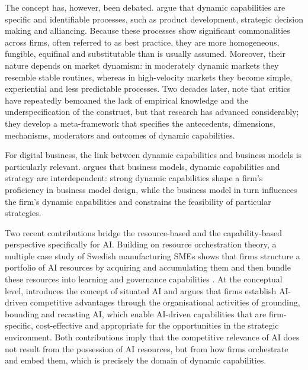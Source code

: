 The concept has, however, been debated. \textcite[1105]{eisenhardt2000} argue that dynamic capabilities are specific and identifiable processes, such as product development, strategic decision making and alliancing. Because these processes show significant commonalities across firms, often referred to as best practice, they are more homogeneous, fungible, equifinal and substitutable than is usually assumed. Moreover, their nature depends on market dynamism: in moderately dynamic markets they resemble stable routines, whereas in high-velocity markets they become simple, experiential and less predictable processes. Two decades later, \textcite[390]{schilke2018} note that critics have repeatedly bemoaned the lack of empirical knowledge and the underspecification of the construct, but that research has advanced considerably; they develop a meta-framework that specifies the antecedents, dimensions, mechanisms, moderators and outcomes of dynamic capabilities.

For digital business, the link between dynamic capabilities and business models is particularly relevant. \textcite[40]{teece2018} argues that business models, dynamic capabilities and strategy are interdependent: strong dynamic capabilities shape a firm's proficiency in business model design, while the business model in turn influences the firm's dynamic capabilities and constrains the feasibility of particular strategies.

Two recent contributions bridge the resource-based and the capability-based perspective specifically for AI. Building on resource orchestration theory, a multiple case study of Swedish manufacturing SMEs shows that firms structure a portfolio of AI resources by acquiring and accumulating them and then bundle these resources into learning and governance capabilities \parencite[1]{slrR057}. At the conceptual level, \textcite[618]{slrR087} introduces the concept of situated AI and argues that firms establish AI-driven competitive advantages through the organisational activities of grounding, bounding and recasting AI, which enable AI-driven capabilities that are firm-specific, cost-effective and appropriate for the opportunities in the strategic environment. Both contributions imply that the competitive relevance of AI does not result from the possession of AI resources, but from how firms orchestrate and embed them, which is precisely the domain of dynamic capabilities.

